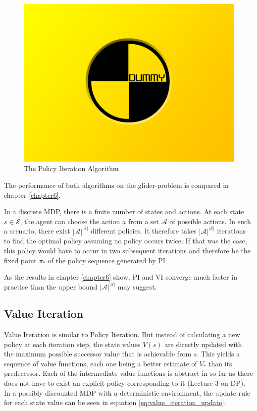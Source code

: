 \begin{figure}[h]
	\includegraphics[width=\textwidth]{src/pics/dummy.jpg}
	\caption{The Policy Iteration Algorithm}
	\label{fig:PI_triangle} 
\end{figure}

The performance of both algorithms on the glider-problem is compared in chapter \ref{chapter6}. \bigbreak

In a discrete MDP, there is a finite number of states and actions. At each state $s \in \mathcal{S}$, the agent can choose the action $a$ from a set $\mathcal{A}$ of possible actions. In such a scenario, there exist $|\mathcal{A}|^{|\mathcal{S}|}$ different policies. It therefore takes $|\mathcal{A}|^{|\mathcal{S}|}$ iterations to find the optimal policy assuming no policy occurs twice. If that was the case, this policy would have to occur in two subsequent iterations and therefore be the fixed point $\pi_*$ of the policy sequence generated by PI.

As the results in chapter \ref{chapter6} show, PI and VI converge much faster in practice than the upper bound $|\mathcal{A}|^{|\mathcal{S}|}$ may suggest.


\subsection{Value Iteration}
\label{subsection:VI}
Value Iteration is similar to Policy Iteration. But instead of calculating a new policy at each iteration step, the state values $V(s)$ are directly updated with the maximum possible successor value that is achievable from $s$. This yields a sequence of value functions, each one being a better estimate of $V_*$ than its predecessor. Each of the intermediate value functions is abstract in so far as there does not have to exist an explicit policy corresponding to it \cite{Silver2015}(Lecture 3 on DP). In a possibly discounted MDP with a deterministic environment, the update rule for each state value can be seen in equation \ref{eq:value_iteration_update}.

